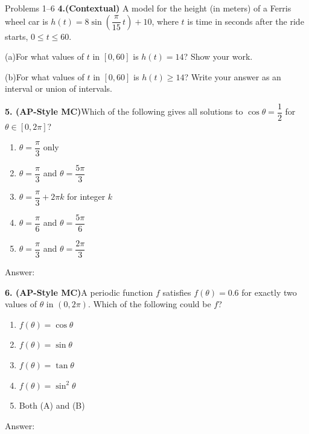 \documentclass[10pt]{article}
\begin{document}
\begin{notesbox}{Problems 1--6}
\vspace{0.14in}
\textbf{4.}\quad \textbf{(Contextual)} A model for the height (in meters) of a
Ferris wheel car is $h(t) = 8\sin\!\left(\dfrac{\pi}{15}\,t\right) + 10$,
where $t$ is time in seconds after the ride starts, $0 \le t \le 60$.

\vspace{4pt}
(a)\quad For what values of $t$ in $[0, 60]$ is $h(t) = 14$?
Show your work.


\vspace{4pt}
(b)\quad For what values of $t$ in $[0, 60]$ is $h(t) \ge 14$?
Write your answer as an interval or union of intervals.


\vspace{0.14in}
\textbf{5. (AP-Style MC)}\quad Which of the following gives all solutions to
$\cos\theta = \dfrac{1}{2}$ for $\theta \in [0, 2\pi]$?

\begin{enumerate}[label=(\Alph*), leftmargin=2em, itemsep=3pt]
  \item $\theta = \dfrac{\pi}{3}$ only
  \item $\theta = \dfrac{\pi}{3}$ and $\theta = \dfrac{5\pi}{3}$
  \item $\theta = \dfrac{\pi}{3} + 2\pi k$ for integer $k$
  \item $\theta = \dfrac{\pi}{6}$ and $\theta = \dfrac{5\pi}{6}$
  \item $\theta = \dfrac{\pi}{3}$ and $\theta = \dfrac{2\pi}{3}$
\end{enumerate}

Answer: \underline{\hspace{1.5cm}}

\vspace{0.14in}
\textbf{6. (AP-Style MC)}\quad A periodic function $f$ satisfies
$f(\theta) = 0.6$ for exactly two values of $\theta$ in $(0, 2\pi)$.
Which of the following could be $f$?

\begin{enumerate}[label=(\Alph*), leftmargin=2em, itemsep=3pt]
  \item $f(\theta) = \cos\theta$
  \item $f(\theta) = \sin\theta$
  \item $f(\theta) = \tan\theta$
  \item $f(\theta) = \sin^2\theta$
  \item Both (A) and (B)
\end{enumerate}

Answer: \underline{\hspace{1.5cm}}

\end{notesbox}
\end{document}
